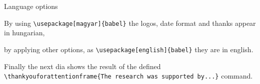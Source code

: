 \documentclass{beamer}
\begin{document}
	\begin{frame}{Language options}
		
		By using \texttt{\textbackslash usepackage[magyar]\{babel\}} the logos, date format and thanks appear in hungarian, 
		
		\vspace{3mm}
		
		by applying other options, as \texttt{\textbackslash usepackage[english]\{babel\}} they are in english.
		
		\vspace{8mm}
		
		Finally the next dia shows the result of the defined \texttt{\textbackslash thankyouforattentionframe\{The research was supported by...\}} command.
		
	\end{frame}

	

	
\end{document}
